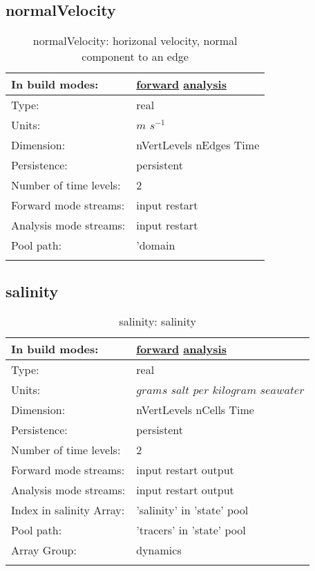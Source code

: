 \subsection[normalVelocity]{normalVelocity}
\label{subsec:var_sec_state_normalVelocity}
\begin{center}
\begin{longtable}{| p{2.0in} | p{4.0in} |}
        \hline 
        In build modes: & \hyperref[subsec:forward_var_tab_state]{forward} \hyperref[subsec:analysis_var_tab_state]{analysis} \\
        \hline 
        Type: & real \\
        \hline 
        Units: & $m$ $s^{-1}$ \\
        \hline 
        Dimension: & nVertLevels nEdges Time \\
        \hline 
        Persistence: & persistent \\
        \hline 
        Number of time levels: & 2 \\
        \hline 
		 Forward mode streams: &  input restart \\
        \hline 
		 Analysis mode streams: &  input restart \\
        \hline 
            Pool path: & 'domain %
 \\
		 \hline 
    \caption{normalVelocity: horizonal velocity, normal component to an edge}
\end{longtable}
\end{center}
\subsection[salinity]{salinity}
\label{subsec:var_sec_state_salinity}
\begin{center}
\begin{longtable}{| p{2.0in} | p{4.0in} |}
        \hline 
        In build modes: & \hyperref[subsec:forward_var_tab_state]{forward} \hyperref[subsec:analysis_var_tab_state]{analysis} \\
        \hline 
        Type: & real \\
        \hline 
        Units: & $grams$ $salt$ $per$ $kilogram$ $seawater$ \\
        \hline 
        Dimension: & nVertLevels nCells Time \\
        \hline 
        Persistence: & persistent \\
        \hline 
        Number of time levels: & 2 \\
        \hline 
		 Forward mode streams: &  input restart output \\
        \hline 
		 Analysis mode streams: &  input restart output \\
        \hline 
		 Index in salinity Array: & 'salinity' in 'state' pool \\
		 \hline 
            Pool path: & 'tracers' in 'state' pool
 \\
		 \hline 
		 Array Group: & dynamics \\
		 \hline 
    \caption{salinity: salinity}
\end{longtable}
\end{center}
